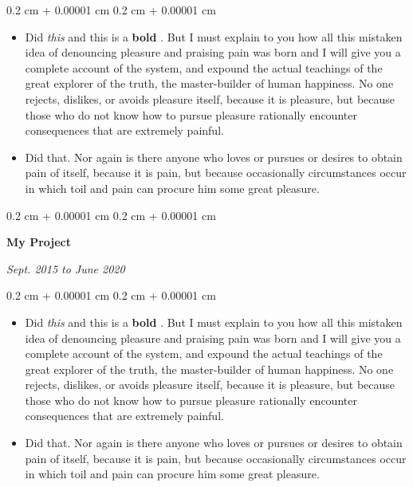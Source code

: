 \documentclass[10pt, letterpaper]{article}
\newenvironment{highlights}{
    \begin{itemize}[
        topsep=0.10 cm,
        parsep=0.10 cm,
        partopsep=0pt,
        itemsep=0pt,
        leftmargin=0.4 cm + 10pt
    ]
}{
    \end{itemize}
} %
\newenvironment{onecolentry}{
    \begin{adjustwidth}{
        0.2 cm + 0.00001 cm
    }{
        0.2 cm + 0.00001 cm
    }
}{
    \end{adjustwidth}
} %
\newenvironment{twocolentry}[2][]{
    \onecolentry
    \def\secondColumn{#2}
    \setcolumnwidth{\fill, 4.5 cm}
    \begin{paracol}{2}
}{
    \switchcolumn \raggedleft \secondColumn
    \end{paracol}
    \endonecolentry
} %
\let\hrefWithoutArrow\href
\renewcommand{\href}[2]{\hrefWithoutArrow{#1}{\mbox{\ifthenelse{\equal{#2}{}}{ }{#2 }\raisebox{.15ex}{\footnotesize \faExternalLink*}}}}
\begin{document}
        \vspace{0.10 cm-3px}
        \begin{onecolentry}
            \begin{highlights}
                \item Did \textit{this} and this is a \textbf{bold} \href{https://example.com}{link}. But I must explain to you how all this mistaken idea of denouncing pleasure and praising pain was born and I will give you a complete account of the system, and expound the actual teachings of the great explorer of the truth, the master-builder of human happiness. No one rejects, dislikes, or avoids pleasure itself, because it is pleasure, but because those who do not know how to pursue pleasure rationally encounter consequences that are extremely painful.
                \item Did that. Nor again is there anyone who loves or pursues or desires to obtain pain of itself, because it is pain, but because occasionally circumstances occur in which toil and pain can procure him some great pleasure.
            \end{highlights}
        \end{onecolentry}


        \vspace{0.2 cm-3px}

        \begin{twocolentry}{
            
            
        \textit{Sept. 2015 to June 2020}}
            \textbf{My Project}
        \end{twocolentry}

        \vspace{0.10 cm-3px}
        \begin{onecolentry}
            \begin{highlights}
                \item Did \textit{this} and this is a \textbf{bold} \href{https://example.com}{link}. But I must explain to you how all this mistaken idea of denouncing pleasure and praising pain was born and I will give you a complete account of the system, and expound the actual teachings of the great explorer of the truth, the master-builder of human happiness. No one rejects, dislikes, or avoids pleasure itself, because it is pleasure, but because those who do not know how to pursue pleasure rationally encounter consequences that are extremely painful.
                \item Did that. Nor again is there anyone who loves or pursues or desires to obtain pain of itself, because it is pain, but because occasionally circumstances occur in which toil and pain can procure him some great pleasure.
            \end{highlights}
        \end{onecolentry}
\end{document}
